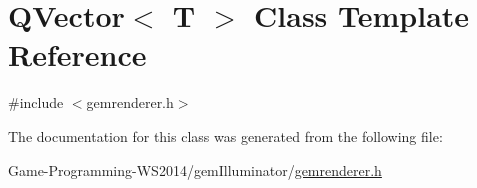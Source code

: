 \hypertarget{class_q_vector}{}\section{Q\+Vector$<$ T $>$ Class Template Reference}
\label{class_q_vector}


{\ttfamily \#include $<$gemrenderer.\+h$>$}



The documentation for this class was generated from the following file\+:\begin{DoxyCompactItemize}
\item 
Game-\/\+Programming-\/\+W\+S2014/gem\+Illuminator/\hyperlink{gemrenderer_8h}{gemrenderer.\+h}\end{DoxyCompactItemize}
